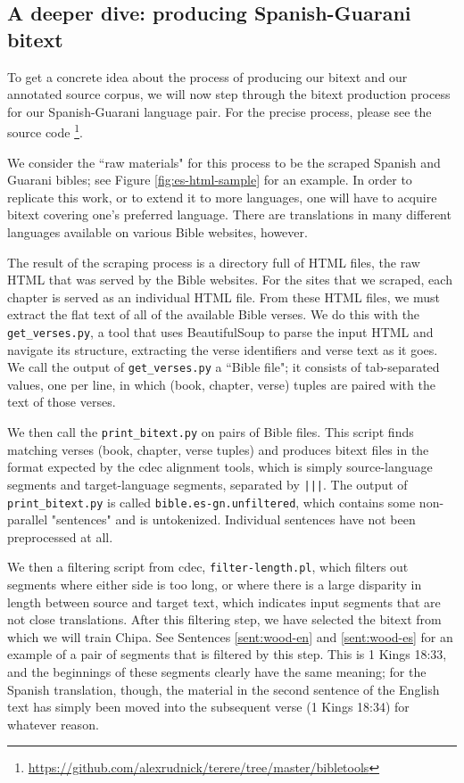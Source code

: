 \subsection{A deeper dive: producing Spanish-Guarani bitext}
To get a concrete idea about the process of producing our bitext and our
annotated source corpus, we will now step through the bitext production process
for our Spanish-Guarani language pair. For the precise process, please see the
source code
\footnote{\url{https://github.com/alexrudnick/terere/tree/master/bibletools}}.

We consider the ``raw materials" for this process to be the scraped Spanish and
Guarani bibles; see Figure \ref{fig:es-html-sample} for an example.  In order
to replicate this work, or to extend it to more languages, one will have to
acquire bitext covering one's preferred language. There are translations in
many different languages available on various Bible websites, however.

The result of the scraping process is a directory full of HTML files, the raw
HTML that was served by the Bible websites. For the sites that we scraped, each
chapter is served as an individual HTML file. From these HTML files, we must
extract the flat text of all of the available Bible verses.  We do this with
the \texttt{get\_verses.py}, a tool that uses BeautifulSoup to parse the input
HTML and navigate its structure, extracting the verse identifiers and verse
text as it goes. We call the output of \texttt{get\_verses.py} a ``Bible file";
it consists of tab-separated values, one per line, in which (book, chapter,
verse) tuples are paired with the text of those verses.

We then call the \texttt{print\_bitext.py} on pairs of Bible files. This script
finds matching verses (book, chapter, verse tuples) and produces bitext files
in the format expected by the cdec alignment tools, which is simply
source-language segments and target-language segments, separated by
\texttt{|||}. The output of \texttt{print\_bitext.py} is called
\texttt{bible.es-gn.unfiltered}, which contains some non-parallel "sentences"
and is untokenized. Individual sentences have not been preprocessed at all.

We then a filtering script from cdec, \texttt{filter-length.pl}, which filters
out segments where either side is too long, or where there is a large disparity
in length between source and target text, which indicates input segments that
are not close translations. After this filtering step, we have selected the
bitext from which we will train Chipa. See Sentences \ref{sent:wood-en} and
\ref{sent:wood-es} for an example of a pair of segments that is filtered by
this step. This is 1 Kings 18:33, and the beginnings of these segments clearly
have the same meaning; for the Spanish translation, though, the material in the
second sentence of the English text has simply been moved into the subsequent
verse (1 Kings 18:34) for whatever reason.

